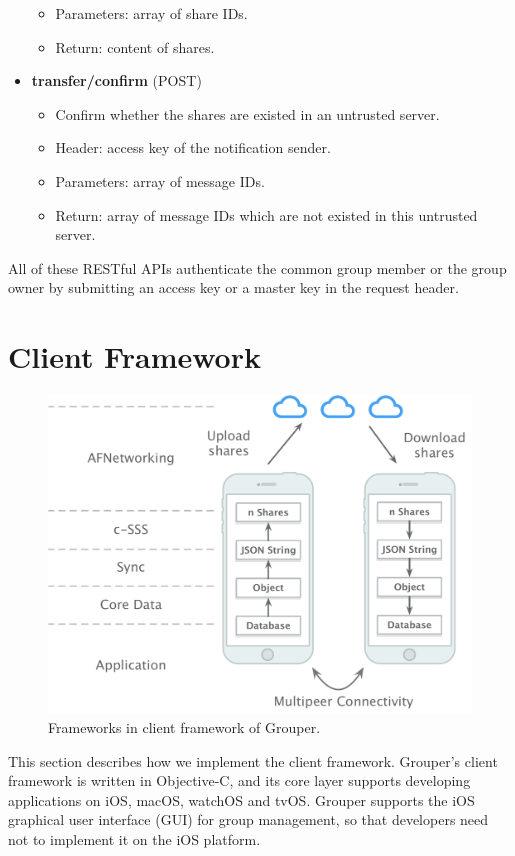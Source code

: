\documentclass[a4paper,11pt]{report}
\begin{document}
\begin{itemize}[leftmargin=7mm]
\begin{itemize}
		\item Parameters: array of share IDs.
		\item Return: content of shares.
	\end{itemize}
	\item 
	\textbf{transfer/confirm} (POST)
	\begin{itemize}
		\item Confirm whether the shares are existed in an untrusted server. 
		\item Header: access key of the notification sender.
		\item Parameters: array of message IDs.
		\item Return: array of message IDs which are not existed in this untrusted server.
	\end{itemize}
\end{itemize}

All of these RESTful APIs authenticate the common group member or the group owner by submitting an access key or a master key in the request header.

\section{Client Framework} \label{section:client_framework}

\begin{figure}
	\centering
	\includegraphics[scale=0.6]{frameworks}
	\caption{Frameworks in client framework of Grouper.}
	\label{fig:frameworks}
\end{figure}

This section describes how we implement the client framework.
Grouper's client framework is written in Objective-C, and its core layer supports developing applications on iOS, macOS, watchOS and tvOS.
Grouper supports the iOS graphical user interface (GUI) for group management, so that developers need not to implement it on the iOS platform.
\end{document}
